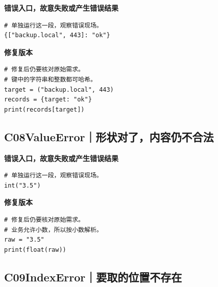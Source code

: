 
\textbf{错误入口，故意失败或产生错误结果}

\begin{lstlisting}[style=errorcode,title={错误复现（故意失败或错误结果）：\code{case_07_bad.py.txt}}]
# 单独运行这一段，观察错误现场。
{["backup.local", 443]: "ok"}
\end{lstlisting}

\textbf{修复版本}

\begin{lstlisting}[title={\code{case_07.py}}]
# 修复后仍要核对原始需求。
# 键中的字符串和整数都可哈希。
target = ("backup.local", 443)
records = {target: "ok"}
print(records[target])
\end{lstlisting}


\subsection*{C08\enspace ValueError｜形状对了，内容仍不合法}





\textbf{错误入口，故意失败或产生错误结果}

\begin{lstlisting}[style=errorcode,title={错误复现（故意失败或错误结果）：\code{case_08_bad.py.txt}}]
# 单独运行这一段，观察错误现场。
int("3.5")
\end{lstlisting}

\textbf{修复版本}

\begin{lstlisting}[title={\code{case_08.py}}]
# 修复后仍要核对原始需求。
# 业务允许小数，所以按小数解析。
raw = "3.5"
print(float(raw))
\end{lstlisting}


\subsection*{C09\enspace IndexError｜要取的位置不存在}

